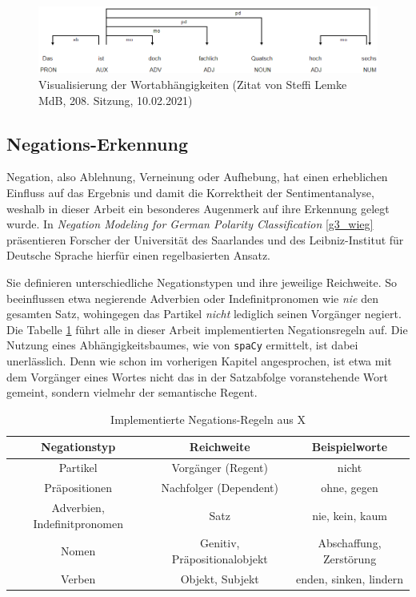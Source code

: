 \begin{figure}[htb]
\centerline{\includegraphics[width=1\textwidth]{steffi.png}}
\caption{Visualisierung der Wortabhängigkeiten (Zitat von Steffi Lemke MdB, 208. Sitzung, 10.02.2021)}
\label{steffi}
\end{figure}

\subsection{Negations-Erkennung}
\label{neg-erkennung}
Negation, also Ablehnung, Verneinung oder Aufhebung, hat einen erheblichen Einfluss auf das Ergebnis und damit die Korrektheit der Sentimentanalyse, weshalb in dieser Arbeit ein besonderes Augenmerk auf ihre Erkennung gelegt wurde. 
In \textit{Negation Modeling for German Polarity Classification} \ref{g3_wieg} präsentieren Forscher der Universität des Saarlandes und des Leibniz-Institut für Deutsche Sprache hierfür einen regelbasierten Ansatz. 

Sie definieren unterschiedliche Negationstypen und ihre jeweilige Reichweite. 
So beeinflussen etwa negierende Adverbien oder Indefinitpronomen wie \textit{nie} den gesamten Satz, wohingegen das Partikel \textit{nicht} lediglich seinen Vorgänger negiert.  
Die Tabelle \ref{tab1} führt alle in dieser Arbeit implementierten Negationsregeln auf. 
Die Nutzung eines Abhängigkeitsbaumes, wie von \texttt{spaCy} ermittelt, ist dabei unerlässlich. 
Denn wie schon im vorherigen Kapitel angesprochen, ist etwa mit dem Vorgänger eines Wortes nicht das in der Satzabfolge voranstehende Wort gemeint, sondern vielmehr der semantische Regent. 

\begin{table}[htbp]
\caption{Implementierte Negations-Regeln aus X}
\begin{center}
\begin{tabular}{| c | c | c |}
\hline
Negationstyp & Reichweite & Beispielworte \\ \hline
Partikel & Vorgänger (Regent) & nicht \\ \hline
Präpositionen & Nachfolger (Dependent) & ohne, gegen \\ \hline
Adverbien, Indefinitpronomen & Satz & nie, kein, kaum \\ \hline
Nomen & Genitiv, Präpositionalobjekt & Abschaffung, Zerstörung \\ \hline
Verben & Objekt, Subjekt & enden, sinken, lindern \\
\hline
\end{tabular}
\label{tab1}
\end{center}
\end{table}

